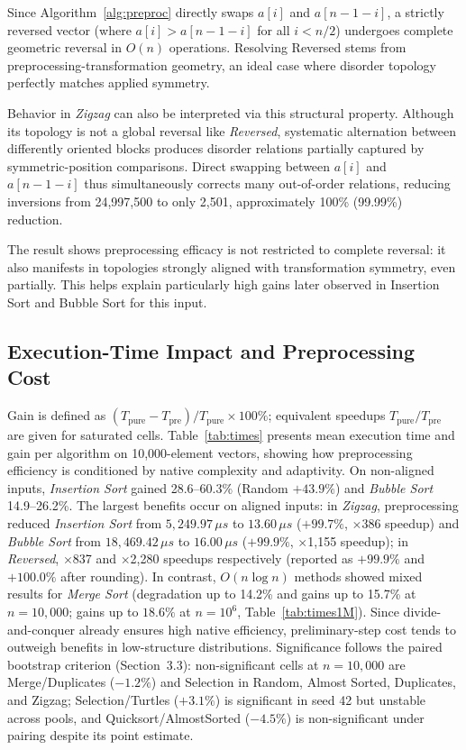 \documentclass[namedate,webpdf,contemporary,large]{TBench-template}%
\theoremstyle{thmstyleone}%
\theoremstyle{thmstyletwo}%
\theoremstyle{thmstylethree}%
\begin{document}
Since Algorithm~\ref{alg:preproc} directly swaps $a[i]$ and $a[n-1-i]$, a strictly reversed vector (where $a[i] > a[n-1-i]$ for all $i<n/2$) undergoes complete geometric reversal in $O(n)$ operations. Resolving Reversed stems from preprocessing-transformation geometry, an ideal case where disorder topology perfectly matches applied symmetry.

Behavior in \emph{Zigzag} can also be interpreted via this structural property. Although its topology is not a global reversal like \emph{Reversed}, systematic alternation between differently oriented blocks produces disorder relations partially captured by symmetric-position comparisons. Direct swapping between $a[i]$ and $a[n-1-i]$ thus simultaneously corrects many out-of-order relations, reducing inversions from 24,997,500 to only 2,501, approximately 100\% (99.99\%) reduction.

The result shows preprocessing efficacy is not restricted to complete reversal: it also manifests in topologies strongly aligned with transformation symmetry, even partially. This helps explain particularly high gains later observed in Insertion Sort and Bubble Sort for this input.

\subsection{Execution-Time Impact and Preprocessing Cost}
Gain is defined as $(T_{\text{pure}}-T_{\text{pre}})/T_{\text{pure}}\times100\%$; equivalent speedups $T_{\text{pure}}/T_{\text{pre}}$ are given for saturated cells. Table~\ref{tab:times} presents mean execution time and gain per algorithm on 10,000-element vectors, showing how preprocessing efficiency is conditioned by native complexity and adaptivity. On non-aligned inputs, \emph{Insertion Sort} gained 28.6--60.3\% (Random $+43.9\%$) and \emph{Bubble Sort} 14.9--26.2\%. The largest benefits occur on aligned inputs: in \emph{Zigzag}, preprocessing reduced \emph{Insertion Sort} from $5{,}249.97\,\mu s$ to $13.60\,\mu s$ ($+99.7\%$, $\times$386 speedup) and \emph{Bubble Sort} from $18{,}469.42\,\mu s$ to $16.00\,\mu s$ ($+99.9\%$, $\times$1,155 speedup); in \emph{Reversed}, $\times$837 and $\times$2,280 speedups respectively (reported as $+99.9\%$ and $+100.0\%$ after rounding). In contrast, $O(n \log n)$ methods showed mixed results for \emph{Merge Sort} (degradation up to 14.2\% and gains up to 15.7\% at $n{=}10{,}000$; gains up to $18.6\%$ at $n{=}10^6$, Table~\ref{tab:times1M}). Since divide-and-conquer already ensures high native efficiency, preliminary-step cost tends to outweigh benefits in low-structure distributions. Significance follows the paired bootstrap criterion (Section~3.3): non-significant cells at $n{=}10{,}000$ are Merge/Duplicates ($-1.2\%$) and Selection in Random, Almost Sorted, Duplicates, and Zigzag; Selection/Turtles ($+3.1\%$) is significant in seed 42 but unstable across pools, and Quicksort/AlmostSorted ($-4.5\%$) is non-significant under pairing despite its point estimate.
\end{document}

